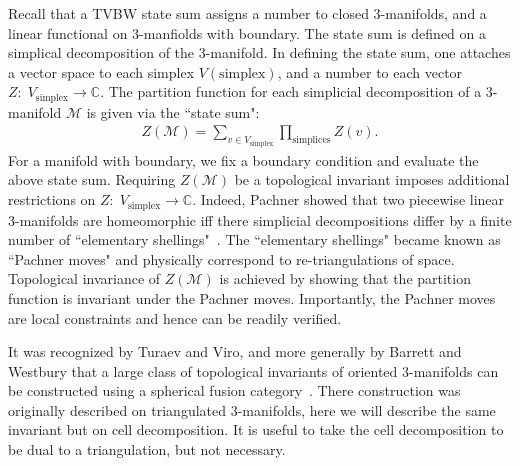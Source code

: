 \documentclass[12pt,a4paper]{article}
\newcounter{arrow}
\newcommand{\ra}{\rightarrow}
\newcommand{\cc}{\mathbb{C}}
\newcommand{\mcm}{\mathcal{M}}
\begin{document}


Recall that a TVBW state sum assigns a number to closed 3-manifolds, 
and a linear functional on 3-manfiolds with boundary. 
The state sum is defined on a simplical decomposition of the 3-manifold.
In defining the state sum, one attaches a vector space to each simplex $V(\text{simplex})$, and a number to each vector $Z: \; V_\text{simplex} \ra \cc$.
The partition function for each simplicial decomposition of a 3-manifold $\mcm$ is given via the ``state sum": 
\begin{align}
Z(\mcm) = \sum_{v \in V_\text{simplex} } \prod_{\text{simplices}} Z(v).
\end{align} 
For a manifold with boundary, we fix a boundary condition and evaluate the above state sum. 
Requiring $Z(\mcm)$ be a topological invariant imposes additional restrictions on $Z: \; V_\text{simplex} \ra \cc$. 
Indeed, Pachner showed that two piecewise linear 3-manifolds are homeomorphic 
iff there simplicial decompositions differ by a finite number of ``elementary shellings"~\cite{Pachner1991}.
The ``elementary shellings" became known as ``Pachner moves" and physically correspond to re-triangulations of space.
Topological invariance of $Z(\mcm)$ is achieved by showing that the partition function is invariant under the Pachner moves.
Importantly, the Pachner moves are local constraints and hence can be readily verified.

It was recognized by Turaev and Viro, and more generally by Barrett and Westbury that a large class of topological invariants of oriented 3-manifolds
can be constructed using a spherical fusion category~\cite{Turaev1992,Barrett1996}.
There construction was originally described on triangulated 3-manifolds, 
here we will describe the same invariant but on cell decomposition.
It is useful to take the cell decomposition to be dual to a triangulation, 
but not necessary. 
\end{document}
